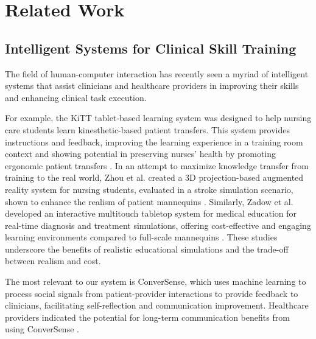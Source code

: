 \section{Related Work}
\subsection{Intelligent Systems for Clinical Skill Training}

The field of human-computer interaction has recently seen a myriad of intelligent systems that assist clinicians and healthcare providers in improving their skills and enhancing clinical task execution. 

For example, the KiTT tablet-based learning system was designed to help nursing care students learn kinesthetic-based patient transfers. This system provides instructions and feedback, improving the learning experience in a training room context and showing potential in preserving nurses' health by promoting ergonomic patient transfers \cite{durr2021kitt}. In an attempt to maximize knowledge transfer from training to the real world, Zhou et al. created a 3D projection-based augmented reality system for nursing students, evaluated in a stroke simulation scenario, shown to enhance the realism of patient mannequins \cite{zhou2022bringing}. Similarly, Zadow et al. developed an interactive multitouch tabletop system for medical education for real-time diagnosis and treatment simulations, offering cost-effective and engaging learning environments compared to full-scale mannequins \cite{von2013simmed}. These studies underscore the benefits of realistic educational simulations and the trade-off between realism and cost.

The most relevant to our system is ConverSense, which uses machine learning to process social signals from patient-provider interactions to provide feedback to clinicians, facilitating self-reflection and communication improvement. Healthcare providers indicated the potential for long-term communication benefits from using ConverSense \cite{bedmutha2024conversense}.

